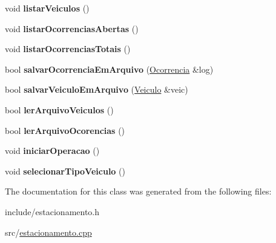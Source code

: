 \begin{DoxyCompactItemize}
void {\bfseries listar\+Veiculos} ()
\item 
\mbox{\label{classEstacionamento_afe3ed572fa1af5eea6c0b37709b51427}} 
void {\bfseries listar\+Ocorrencias\+Abertas} ()
\item 
\mbox{\label{classEstacionamento_a968f0a2e7cb15e6cd56e8993e8f545d1}} 
void {\bfseries listar\+Ocorrencias\+Totais} ()
\item 
\mbox{\label{classEstacionamento_af7ee5a954f739ddd645444bef3afccba}} 
bool {\bfseries salvar\+Ocorrencia\+Em\+Arquivo} (\hyperlink{classOcorrencia}{Ocorrencia} \&log)
\item 
\mbox{\label{classEstacionamento_a22f37266f480a52908e4f4b15a0bba08}} 
bool {\bfseries salvar\+Veiculo\+Em\+Arquivo} (\hyperlink{classVeiculo}{Veiculo} \&veic)
\item 
\mbox{\label{classEstacionamento_ababcab3f0c2ac1a530e554216524ade4}} 
bool {\bfseries ler\+Arquivo\+Veiculos} ()
\item 
\mbox{\label{classEstacionamento_a1cf2b3e312c02746102a2a06c4843b9c}} 
bool {\bfseries ler\+Arquivo\+Ocorencias} ()
\item 
\mbox{\label{classEstacionamento_aa95d8d36dc7c111e0b6d25a023711ef4}} 
void {\bfseries iniciar\+Operacao} ()
\item 
\mbox{\label{classEstacionamento_a38da97a6006b54e1185c9652a96d90e6}} 
void {\bfseries selecionar\+Tipo\+Veiculo} ()
\end{DoxyCompactItemize}


The documentation for this class was generated from the following files\+:\begin{DoxyCompactItemize}
\item 
include/estacionamento.\+h\item 
src/\hyperlink{estacionamento_8cpp}{estacionamento.\+cpp}\end{DoxyCompactItemize}
